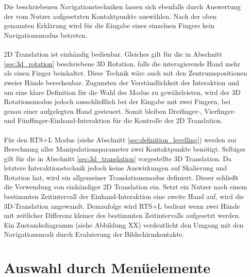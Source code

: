 \\\\
Die beschriebenen Navigationstechniken lassen sich ebenfalls durch Auswertung der vom Nutzer aufgesetzten Kontaktpunkte auswählen. Nach der oben genannten Erklärung wird für die Eingabe eines einzelnen Fingers kein Navigationsmodus betreten.
\\\\
2D Translation ist einhändig bedienbar. Gleiches gilt für die in Abschnitt \ref{sec:3d_rotation} beschriebene 3D Rotation, falls die interagierende Hand mehr als einen Finger beinhaltet. Diese Technik wäre auch mit den Zentrumspositionen zweier Hände berechenbar. Zugunsten der Verständlichkeit der Interaktion und um eine klare Definition für die Wahl des Modus zu gewährleisten, wird der 3D Rotationsmodus jedoch ausschließlich bei der Eingabe mit zwei Fingern, bei genau einer aufgelegten Hand gesteuert. Somit bleiben Dreifinger-, Vierfinger- und Fünffinger-Einhand-Interaktion für die Kontrolle der 2D Translation.
\\\\
Für den RTS+L Modus (siehe Abschnitt \ref{sec:definition_levelling}) werden zur Berechnung aller Manipulationsparameter zwei Kontaktpunkte benötigt. Selbiges gilt für die in Abschnitt \ref{sec:3d_translation} vorgestellte 3D Translation. Da letztere Interaktionstechnik jedoch keine Auswirkungen auf Skalierung und Rotation hat, wird ein allgemeiner Translationsmodus definiert. Dieser schließt die Verwendung von einhändiger 2D Translation ein. Setzt ein Nutzer nach einem bestimmten Zeitintervall der Einhand-Interaktion eine zweite Hand auf, wird die  3D-Translation angewandt. Demzufolge wird RTS+L bedient wenn zwei Hände mit zeitlicher Differenz kleiner des bestimmten Zeitintervalls aufgesetzt werden. Ein Zustandsdiagramm (siehe Abbildung XX) verdeutlicht den Umgang mit den Navigationsmodi durch Evaluierung der Bildschirmkontakte.


\section{Auswahl durch Menüelemente}
\label{sec:menu_elemente}

